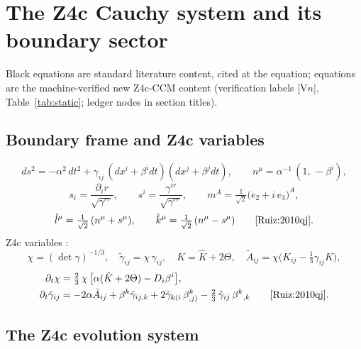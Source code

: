 \section{The Z4c Cauchy system and its boundary sector}
\label{sec:cauchy}

Black equations are standard literature content, cited at the equation;  equations are the machine-verified new Z4c-CCM content (verification labels [V$n$], Table~\ref{tab:static}; ledger nodes in section titles).
\subsection{Boundary frame and Z4c variables}
\label{sec:frame}

\begin{equation}
ds^2 = -\alpha^2\,dt^2 + \gamma_{ij}\,(dx^i+\beta^i dt)(dx^j+\beta^j dt),
\qquad
n^\mu = \alpha^{-1}\,(1,\,-\beta^i),
\label{eq:adm}
\end{equation}
\begin{equation}
s_i = \frac{\partial_i r}{\sqrt{\gamma^{rr}}},\qquad
s^i = \frac{\gamma^{ir}}{\sqrt{\gamma^{rr}}},\qquad
m^A = \tfrac{1}{\sqrt{2}}\big(e_2 + i\,e_3\big)^A,
\label{eq:normal}
\end{equation}
\begin{equation}
\mathring{l}^\mu = \tfrac{1}{\sqrt{2}}\,(n^\mu + s^\mu),\qquad
\mathring{k}^\mu = \tfrac{1}{\sqrt{2}}\,(n^\mu - s^\mu)
\qquad\text{\cite{Ruiz:2010qj}}.
\label{eq:nullvecs}
\end{equation}
Z4c variables \cite{Ruiz:2010qj}:
\begin{equation}
\chi = (\det\gamma)^{-1/3},\quad
\tilde\gamma_{ij} = \chi\,\gamma_{ij},\quad
K = \hat K + 2\Theta,\quad
\tilde A_{ij} = \chi\Big(K_{ij}-\tfrac{1}{3}\gamma_{ij}K\Big),
\label{eq:z4cvars}
\end{equation}
\begin{align}
\partial_t \chi &= \tfrac{2}{3}\,\chi\,\big[\alpha(\hat K + 2\Theta) - D_i\beta^i\big],
\label{eq:dtchi}\\
\partial_t \tilde\gamma_{ij} &= -2\alpha \tilde A_{ij}
 + \beta^k \tilde\gamma_{ij,k}
 + 2\tilde\gamma_{k(i}\,\beta^k_{,j)}
 - \tfrac{2}{3}\,\tilde\gamma_{ij}\,\beta^k{}_{,k}
\qquad\text{\cite{Ruiz:2010qj}}.
\label{eq:dtgt}
\end{align}


\subsection{The Z4c evolution system}
\label{sec:z4csys}

